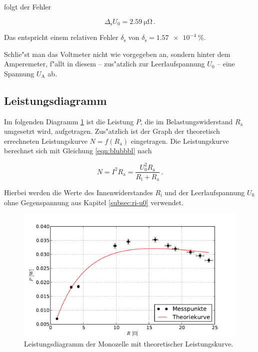 		folgt der Fehler

		\begin{equation*}
			\Delta_\mathrm{s} U_0 = \SI{2.59}{\micro \ohm} \,.
		\end{equation*}

		Das entspricht einem relativen Fehler $\delta_\mathrm{s}$ von $\delta_\mathrm{s} = \SI{1.57e-4}{\percent}$.

		Schlie"st man das Voltmeter nicht wie vorgegeben an, sondern hinter dem Amperemeter, f"allt in diesem -- zus"atzlich zur Leerlaufspannung $U_0$ -- eine Spannung $U_\mathrm{A}$ ab.

	\subsection{Leistungsdiagramm}
	\label{subsec:leistung}
		Im folgenden Diagramm \ref{fig:graph_monozelle_leistung} ist die Leistung $P$, die im Belastungswiderstand $R_\mathrm{a}$ umgesetzt wird, aufgetragen.
		Zus"atzlich ist der Graph der theoretisch errechneten Leistungskurve $N = f(R_\mathrm{a})$ eingetragen.
		Die Leistungskurve berechnet sich mit Gleichung \eqref{eqn:blubbbl} nach

		\begin{equation*}
			N = I^2 R_\mathrm{a} = \frac{U_0^2 R_\mathrm{a}}{R_\mathrm{i} + R_\mathrm{a}} \,.
		\end{equation*}

		Hierbei werden die Werte des Innenwiderstandes $R_\mathrm{i}$ und der Leerlaufspannung $U_0$ ohne Gegenspannung aus Kapitel \ref{subsec:ri-u0} verwendet.

		\begin{figure}[h]
			\centering
			\includegraphics[width = 15cm]{img/graph_monozelle_leistung.pdf}
			\caption{Leistungsdiagramm der Monozelle mit theoretischer Leistungskurve. \label{fig:graph_monozelle_leistung}}
		\end{figure}